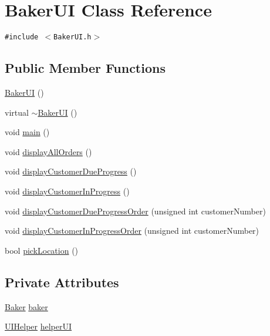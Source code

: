 \hypertarget{class_baker_u_i}{
\section{Baker\-UI Class Reference}
\label{class_baker_u_i}
}
{\tt \#include $<$Baker\-UI.h$>$}

\subsection*{Public Member Functions}
\begin{CompactItemize}
\item 
\hyperlink{class_baker_u_i_87258ad33e2a7d3de72a762f438be622}{Baker\-UI} ()
\item 
virtual \hyperlink{class_baker_u_i_915b879a3aa8be3782d3a24fd36fb81d}{$\sim$Baker\-UI} ()
\item 
void \hyperlink{class_baker_u_i_ea83b916b3f52eec32ae6d54d59b4453}{main} ()
\item 
void \hyperlink{class_baker_u_i_d69822b9289cd53fa4da8f4f39864d19}{display\-All\-Orders} ()
\item 
void \hyperlink{class_baker_u_i_00eeac47a993278134a2d8ba936f6f31}{display\-Customer\-Due\-Progress} ()
\item 
void \hyperlink{class_baker_u_i_49612691d8a1c466378d3e4507aff847}{display\-Customer\-In\-Progress} ()
\item 
void \hyperlink{class_baker_u_i_9afa245c6153335e553d88f8e7ad2c2e}{display\-Customer\-Due\-Progress\-Order} (unsigned int customer\-Number)
\item 
void \hyperlink{class_baker_u_i_12edcb5c93a8a60d06b8c9de906c4be0}{display\-Customer\-In\-Progress\-Order} (unsigned int customer\-Number)
\item 
bool \hyperlink{class_baker_u_i_74d0d6b7d7493e8a9703bc8fbeb79f2e}{pick\-Location} ()
\end{CompactItemize}
\subsection*{Private Attributes}
\begin{CompactItemize}
\item 
\hyperlink{class_baker}{Baker} \hyperlink{class_baker_u_i_623466d63908ff643b88d946e2f2fbd6}{baker}
\item 
\hyperlink{class_u_i_helper}{UIHelper} \hyperlink{class_baker_u_i_165ca02db075e280199e0970e3465900}{helper\-UI}
\end{CompactItemize}


